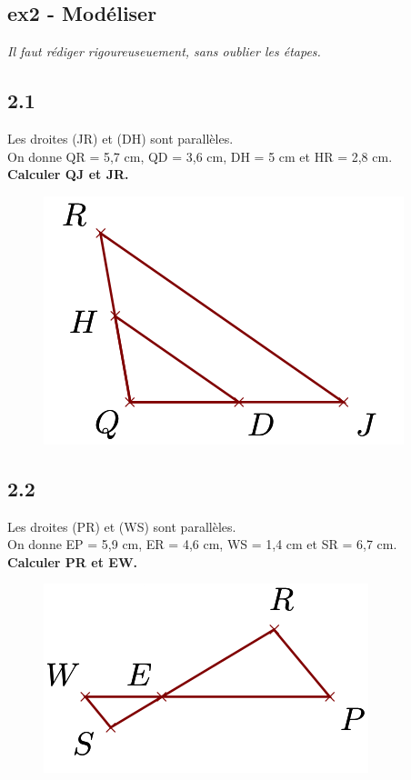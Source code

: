 \documentclass[12pt]{article}
\begin{document}
\subsection*{ex2 - Modéliser}
\textit{Il faut rédiger rigoureuseuement, sans oublier les étapes.}

\begin{multicols}{2}

  \subsection*{2.1}

  \begin{multicols}{2}

    Les droites (JR) et (DH) sont parallèles.\\
    On donne QR = 5,7 cm, QD = 3,6 cm, DH = 5 cm et HR = 2,8 cm.\\
    \textbf{Calculer QJ et JR.}
    \begin{figure}[H]
      \centering
      \includegraphics[width=.5\linewidth]{4x6-thales/sources/th1.png}
    \end{figure}

  \end{multicols}

  \subsection*{2.2}
  \begin{multicols}{2}
    Les droites (PR) et (WS) sont parallèles.\\
    On donne EP = 5,9 cm, ER = 4,6 cm, WS = 1,4 cm et SR = 6,7 cm.\\
    \textbf{Calculer PR et EW.}
    \begin{figure}[H]
      \centering
      \includegraphics[width=.5\linewidth]{4x6-thales/sources/th2.png}
    \end{figure}
  \end{multicols}



\end{multicols}
\end{document}
